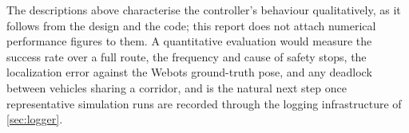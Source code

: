 The descriptions above characterise the controller's behaviour qualitatively, as it follows from the design and the code; this report does not attach numerical performance figures to them. A quantitative evaluation would measure the success rate over a full route, the frequency and cause of safety stops, the localization error against the Webots ground-truth pose, and any deadlock between vehicles sharing a corridor, and is the natural next step once representative simulation runs are recorded through the logging infrastructure of \cref{sec:logger}.
